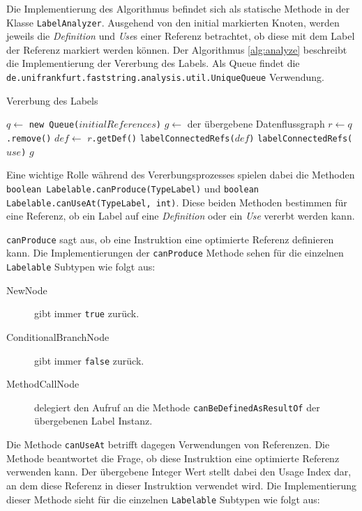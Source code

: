 Die Implementierung des Algorithmus befindet sich als statische Methode in der Klasse 
\texttt{LabelAnalyzer}. Ausgehend von den initial markierten Knoten, werden jeweils die 
\textit{Definition} und \textit{Use}s einer Referenz betrachtet, ob diese mit dem Label der Referenz 
markiert werden können. Der Algorithmus \ref{alg:analyze} beschreibt die Implementierung 
der Vererbung des Labels. Als Queue findet die 
\texttt{de.unifrankfurt.faststring.analysis.util.UniqueQueue} Verwendung.

\begin{algorithm}[H]
	\caption{Vererbung des Labels}\label{alg:analyze}
	\begin{algorithmic}[1]
		\STATE $q \gets$ \texttt{new Queue($initialReferences$)}
		\STATE $g \gets$ der übergebene Datenflussgraph
			\STATE $r \gets q$\texttt{.remove()}
				\STATE $def \gets$ \texttt{$r$.getDef()}
					\STATE \texttt{labelConnectedRefs($def$)}
				\ENDIF
						\STATE \texttt{labelConnectedRefs($use$)}
					\ENDIF
				\ENDFOR
			\ENDIF
		\ENDWHILE
		\RETURN $g$
	\end{algorithmic}
\end{algorithm}

Eine wichtige Rolle während des Vererbungsprozesses spielen dabei die Methoden 
\texttt{boolean Labelable.canProduce(TypeLabel)} und
\texttt{boolean Labelable.canUseAt(TypeLabel, int)}. Diese beiden Methoden bestimmen 
für eine Referenz, ob ein Label auf eine \textit{Definition} oder ein \textit{Use} vererbt werden kann.

\texttt{canProduce} sagt aus, ob eine Instruktion eine optimierte Referenz definieren kann. 
Die Implementierungen der \texttt{canProduce} Methode sehen für die einzelnen \texttt{Labelable}
Subtypen wie folgt aus:

\begin{description}
	\item[NewNode] gibt immer \texttt{true} zurück.
	\item[ConditionalBranchNode] gibt immer \texttt{false} zurück.
	\item[MethodCallNode] delegiert den Aufruf an die Methode \texttt{canBeDefinedAsResultOf} der
	übergebenen Label Instanz.
\end{description}

Die Methode \texttt{canUseAt} betrifft dagegen Verwendungen von Referenzen. Die Methode beantwortet 
die Frage, ob diese Instruktion eine optimierte Referenz verwenden kann. Der übergebene Integer Wert 
stellt dabei den Usage Index dar, an dem diese Referenz in dieser Instruktion verwendet wird. 
Die Implementierung dieser Methode sieht für die einzelnen \texttt{Labelable}
Subtypen wie folgt aus:

